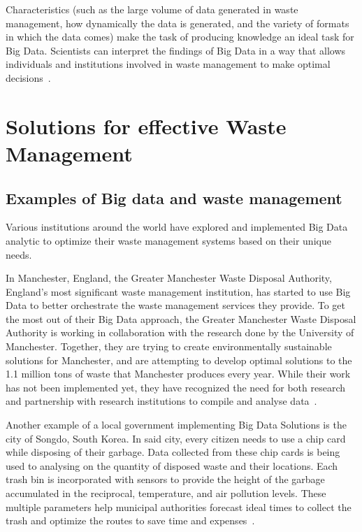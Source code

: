 Characteristics (such as the large volume of data generated in waste 
management, how dynamically the data is generated, and the variety of 
formats in which the data comes) make the task of producing knowledge an 
ideal task for Big Data.  Scientists can interpret the findings of Big Data  
in a way that allows individuals and institutions involved in waste management 
to make optimal decisions~\cite{yenkar2014review}. 

\section{Solutions for effective Waste Management}

\subsection{ Examples of Big data and waste management}

Various institutions around the world have explored and implemented Big Data 
analytic to optimize their waste management systems based on their unique 
needs.

In Manchester, England, the Greater Manchester Waste Disposal Authority, 
England's most significant waste management institution, has started to 
use Big Data to better orchestrate the waste management services they 
provide. To get the most out of their Big Data approach, the Greater 
Manchester Waste Disposal Authority is working in collaboration with the 
research done by the University of Manchester. Together, they are trying 
to create environmentally sustainable solutions for Manchester, and are 
attempting to develop optimal solutions to the 1.1 million tons of waste 
that Manchester produces every year.   While their work has not been 
implemented yet, they have recognized the need for both research and 
partnership with research institutions to compile and analyse 
data~\cite{markvan2016}.

Another example of a local government implementing Big Data Solutions is 
the city of  Songdo, South Korea. In said city, every citizen needs to use 
a chip card while disposing of their garbage. Data collected from these 
chip cards is being used to analysing on the quantity of disposed waste and 
their locations. Each trash bin is incorporated with sensors to provide the 
height of the garbage accumulated in the reciprocal, temperature, and air 
pollution levels. These multiple parameters help municipal authorities 
forecast ideal times to collect the trash and optimize the routes to save 
time and expenses~\cite{markvan2016}.


